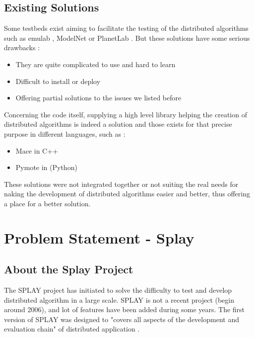 \documentclass{eplmastersthesis}
\begin{document}
    \section{Existing Solutions}

      Some testbeds exist aiming to facilitate the testing of the
      distributed algorithms such as emulab \cite{Emulab}, ModelNet
      \cite{ModelNet} or PlanetLab \cite{PlanetLab}. But these solutions have
      some serious drawbacks :

      \begin{itemize}
        \item They are quite complicated to use and hard to learn
        \item Difficult to install or deploy
        \item Offering partial solutions to the issues we listed before
      \end{itemize}

      Concerning the code itself, supplying a high level library helping the
      creation of distributed algorithms is indeed a solution and those
      exists for that precise purpose in different languages, such as :

      \begin{itemize}
        \item Mace \cite{Mace} in C++
        \item Pymote \cite{Pymote} in (Python)
      \end{itemize}

      These solutions were not integrated together or not suiting the real needs
      for naking the development of distributed algorithms easier and better,
      thus offering a place for a better solution.

  \chapter{Problem Statement - Splay}

    \section{About the Splay Project}

      The SPLAY project has initiated to solve the difficulty to test and
      develop distributed algorithm in a large scale. SPLAY is not a recent
      project (begin around 2006), and lot of features have been added during
      some years. The first version of SPLAY  was designed to "covers all
      aspects of the development and evaluation chain" of distributed
      application \cite{SPLAY}. \\
\end{document}
